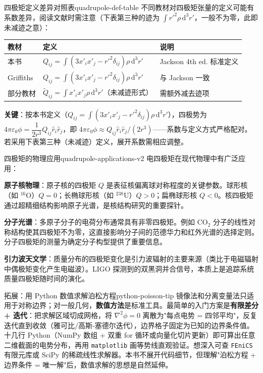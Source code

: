 \documentclass[11pt,a4paper,openany,oneside]{book}
\newcommand{\diff}{\mathrm{d}}
\newcommand{\eps}{\varepsilon}
\newcommand{\lap}{\nabla^2}
\begin{document}
\begin{tip}{四极矩定义差异对照表}{quadrupole-def-table}
不同教材对四极矩张量的定义可能有系数差异，阅读文献时需注意（下表第三种的迹为 $\int r'^2\rho\,\diff^3r'$，一般不为零，此即未减迹之意）：
\begin{center}
\begin{tabular}{lll}
\toprule
\textbf{教材} & \textbf{定义} & \textbf{说明} \\
\midrule
本书 & $Q_{ij}=\int(3x'_ix'_j-r'^2\delta_{ij})\rho\,\diff^3r'$ & Jackson 4th ed. 标准定义 \\
Griffiths & $Q_{ij}=\int(3x'_ix'_j-r'^2\delta_{ij})\rho\,\diff^3r'$ & 与 Jackson 一致 \\
部分教材 & $\tilde{Q}_{ij}=\int x'_ix'_j\rho\,\diff^3r'$（未减迹形式） & 需额外减去迹项 \\
\bottomrule
\end{tabular}
\end{center}
\textbf{关键}：按本书定义（$Q_{ij}=\int(3x'_ix'_j-r'^2\delta_{ij})\rho\,\diff^3r'$），四极势为 $4\pi\eps_0\phi = \dfrac{1}{2r^3}Q_{ij}\hat{r}_i\hat{r}_j$，即 $4\pi\eps_0\phi\approx Q_{ij}\hat{r}_i\hat{r}_j/(2r^3)$——系数与定义方式严格配对。若采用下表第三种（未减迹）定义，展开系数需相应调整。
\end{tip}


\begin{insight}{四极矩的物理应用}{quadrupole-applications-v2}
电四极矩在现代物理中有广泛应用：

\textbf{原子核物理}：原子核的四极矩 $Q$ 是表征核偏离球对称程度的关键参数。球形核（如 $^{16}$O）$Q = 0$；长椭球形核（如 $^{238}$U）$Q > 0$；扁椭球形核 $Q < 0$。核四极矩通过超精细结构影响原子光谱，是核结构研究的重要探针。

\textbf{分子光谱}：多原子分子的电荷分布通常具有非零四极矩。例如 CO$_2$ 分子的线性对称结构使其四极矩不为零，这直接影响分子间的范德华力和红外光谱的选择定则。分子四极矩的测量为确定分子构型提供了重要信息。

\textbf{引力波天文学}：质量分布的四极矩变化是引力波辐射的主要来源（类比于电磁辐射中偶极矩变化产生电磁波）。LIGO 探测到的双黑洞并合信号，本质上是追踪系统质量四极矩随时间的演化。
\end{insight}

\begin{tip}{拓展：用 Python 数值求解泊松方程}{python-poisson-tip}
镜像法和分离变量法只适用于对称边界；对一般几何，\textbf{数值方法}是标准工具。最简单的入门方案是\textbf{有限差分 + 迭代}：把求解区域切成网格，将 $\lap\phi = 0$ 离散为"每点电势 = 四邻平均"，反复迭代直到收敛（雅可比/高斯-塞德尔迭代），边界格子固定为已知的边界条件值。十几行 Python（NumPy 数组 + 双重 for 循环或向量化切片更新）即可算出任意二维截面的电势分布，再用 \texttt{matplotlib} 画等势线直观验证。想深入可查 \texttt{FEniCS} 有限元库或 SciPy 的稀疏线性求解器。本书不展开代码细节，但理解"泊松方程 + 边界条件 = 唯一解"后，数值求解的思想是自然延伸。
\end{tip}
\end{document}
